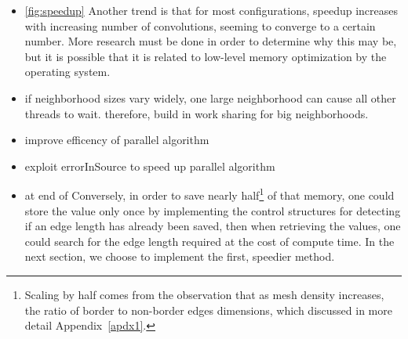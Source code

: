 \begin{itemize}
	\item \ref{fig:speedup} Another trend is that for most configurations, speedup increases with increasing number of convolutions, seeming to converge to a certain number. More research must be done in order to determine why this may be, but it is possible that it is related to low-level memory optimization by the operating system.
	\item if neighborhood sizes vary widely, one large neighborhood can cause all other threads to wait. therefore, build in work sharing for big neighborhoods.
	\item improve efficency of parallel algorithm
	\item exploit errorInSource to speed up parallel algorithm
	\item at end of \label{ch5sCELPssASACEL} Conversely, in order to save nearly half\footnote{Scaling by half comes from the observation that as mesh density increases, the ratio of border to non-border edges dimensions, which discussed in more detail Appendix~\ref{apdx1}.} of that memory, one could store the value only once by implementing the control structures for detecting if an edge length has already been saved, then when retrieving the values, one could search for the edge length required at the cost of compute time. In the next section, we choose to implement the first, speedier method.
\end{itemize}

